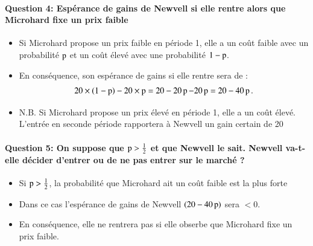 \documentclass[notes, ignorenonframetext, compress, 9pt, xcolor=svgnames, aspectratio=169]{beamer}
\begin{document}
\begin{frame}
[allowframebreaks]{\insertsection}
\framesubtitle{Question 4: 
Espérance de gains de Newvell si elle rentre alors que Microhard fixe un prix faible}
\begin{itemize}
  \item Si Microhard propose un prix faible en période 1, 
  elle a un coût faible avec un probabilité $\operatorname{p}$ et un coût élevé avec une probabilité $1 - \operatorname{p}$. 
  \item En conséquence, son espérance de gains si elle rentre sera de :
\begin{align*}
  20 \times (1 - \operatorname{p}) - 20 \times \operatorname{p} = 20 - 20\operatorname{p} -20\operatorname{p} = 20 - 40\operatorname{p}.
\end{align*}
\item N.B. Si Microhard propose un prix élevé en période 1, 
elle a un coût élevé. L’entrée en seconde période rapportera à Newvell un gain certain de 20
\end{itemize}
\end{frame}  
%
%
\begin{frame}
  [allowframebreaks]{\insertsection}
  \framesubtitle{Question 5: 
  On suppose que $\operatorname{p}> \frac{1}{2}$ et que Newvell le sait. 
  Newvell va-t-elle décider d’entrer ou de ne pas entrer sur le marché ?}
  \begin{itemize}
    \item Si $\operatorname{p} > \frac{1}{2}$, la probabilité que Microhard ait un coût faible est la plus forte
    \item Dans ce cas l’espérance de gains de Newvell $(20 - 40\operatorname{p})$ sera $< 0$. 
    \item En conséquence, elle ne rentrera pas si elle obserbe que Microhard fixe un prix faible.
  \end{itemize}
\end{frame}  
\end{document}
